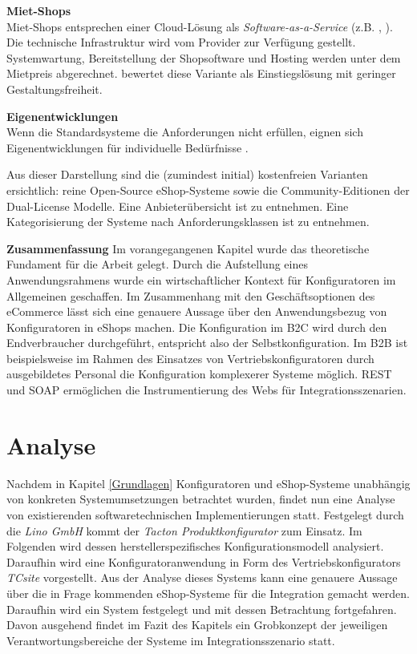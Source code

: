 \documentclass[11pt, a4paper, titlepage, listof=totoc, bibliography=totoc, index=totoc, twoside, openright, headings=normal, draft]{scrreprt}
\begin{document}
\textbf{Miet-Shops}\\
Miet-Shops entsprechen einer Cloud-Lösung als \emph{Software-as-a-Service} (z.B. \citet{stratoWebshops}, \citet{shopify15}). Die technische Infrastruktur wird vom Provider zur Verfügung gestellt. Systemwartung, Bereitstellung der Shopsoftware und Hosting werden unter dem Mietpreis abgerechnet. \citet{stahl15} bewertet diese Variante als Einstiegslösung mit geringer Gestaltungsfreiheit.

\textbf{Eigenentwicklungen}\\
Wenn die Standardsysteme die Anforderungen nicht erfüllen, eignen sich Eigenentwicklungen für individuelle Bedürfnisse \citep{stahl15, graf14}.

Aus dieser Darstellung sind die (zumindest initial) kostenfreien Varianten ersichtlich: reine Open-Source eShop-Systeme sowie die Community-Editionen der Dual-License Modelle. Eine Anbieterübersicht ist \citet{t3n14} zu entnehmen. Eine Kategorisierung der Systeme nach Anforderungsklassen ist \citet{graf14} zu entnehmen.

\textbf{Zusammenfassung}
Im vorangegangenen Kapitel wurde das theoretische Fundament für die Arbeit gelegt. Durch die Aufstellung eines Anwendungsrahmens wurde ein wirtschaftlicher Kontext für Konfiguratoren im Allgemeinen geschaffen. Im Zusammenhang mit den Geschäftsoptionen des eCommerce lässt sich eine genauere Aussage über den Anwendungsbezug von Konfiguratoren in eShops machen. Die Konfiguration im B2C wird durch den Endverbraucher durchgeführt, entspricht also der Selbstkonfiguration. Im B2B ist beispielsweise im Rahmen des Einsatzes von Vertriebskonfiguratoren durch ausgebildetes Personal die Konfiguration komplexerer Systeme möglich. REST und SOAP ermöglichen die Instrumentierung des Webs für Integrationsszenarien.

\chapter{Analyse}
\label{section:Analyse}

Nachdem in Kapitel \ref{Grundlagen} Konfiguratoren und eShop-Systeme unabhängig von konkreten Systemumsetzungen betrachtet wurden, findet nun eine Analyse von existierenden softwaretechnischen Implementierungen statt. Festgelegt durch die \emph{Lino GmbH} kommt der \emph{Tacton Produktkonfigurator} zum Einsatz. Im Folgenden wird dessen herstellerspezifisches Konfigurationsmodell analysiert. Daraufhin wird eine Konfiguratoranwendung in Form des Vertriebskonfigurators \emph{TCsite} vorgestellt. Aus der Analyse dieses Systems kann eine genauere Aussage über die in Frage kommenden eShop-Systeme für die Integration gemacht werden. Daraufhin wird ein System festgelegt und mit dessen Betrachtung fortgefahren. Davon ausgehend findet im Fazit des Kapitels ein Grobkonzept der jeweiligen Verantwortungsbereiche der Systeme im Integrationsszenario statt.
\end{document}
